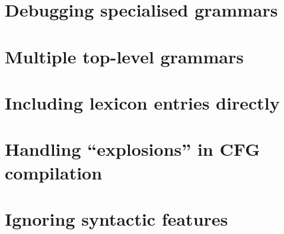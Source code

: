 \section{Debugging specialised grammars}
\label{Section:DebuggingSpecialisedGrammars}

\section{Multiple top-level grammars}
\label{Section:MultipleTopLevelGrammars}

\section{Including lexicon entries directly}
\label{Section:IncludingLexEntries}

\section{Handling ``explosions'' in CFG compilation}
\label{Section:CFGExplosions}

\section{Ignoring syntactic features}
\label{Section:IgnoringFeaturesSpecialised}
